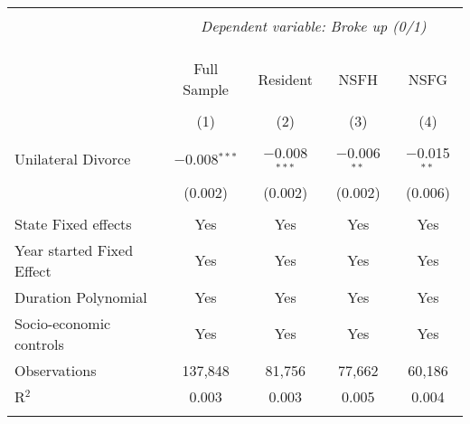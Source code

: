 
\begingroup 
\footnotesize 
\begin{tabular}{@{\extracolsep{5pt}}lcccc} 
\\[-1.8ex]\hline 
\hline \\[-1.8ex] 
 & \multicolumn{4}{c}{\textit{Dependent variable: Broke up (0/1)}} \\ 
\cline{2-5} 
\\[-1.8ex] &  &  &  & \\[-4.8ex] \\ 
 & Full Sample & Resident & NSFH & NSFG \\ 
\\[-1.8ex] & (1) & (2) & (3) & (4)\\ 
\hline \\[-1.8ex] 
 Unilateral Divorce & $-$0.008$^{***}$ & $-$0.008$^{***}$ & $-$0.006$^{**}$ & $-$0.015$^{**}$ \\ 
  & (0.002) & (0.002) & (0.002) & (0.006) \\ 
 \hline \\[-1.8ex] 
State Fixed effects & Yes & Yes & Yes & Yes \\ 
Year started Fixed Effect & Yes & Yes & Yes & Yes \\ 
Duration Polynomial & Yes & Yes & Yes & Yes \\ 
Socio-economic controls & Yes & Yes & Yes & Yes \\ 
Observations & 137,848 & 81,756 & 77,662 & 60,186 \\ 
R$^{2}$ & 0.003 & 0.003 & 0.005 & 0.004 \\ 
\hline 
\hline \\[-1.8ex] 
\end{tabular} 
\endgroup 
